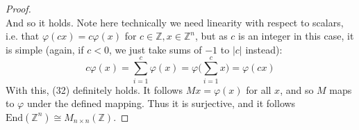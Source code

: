 \documentclass[12pt]{article}
\newenvironment{ex}[2][Exercise]{\begin{trivlist}
\item[\hskip \labelsep {\bfseries #1}\hskip \labelsep {\bfseries #2.}]}{\end{trivlist}}
\begin{document}
\begin{ex}{3}
\begin{enumerate}[label=(\alph*)]
\begin{proof}
\begin{equation}
        \end{equation}
        And so it holds. Note here technically we need linearity with respect to scalars, i.e. that $\varphi(cx) = c\varphi(x)$ for $c \in \mathbb{Z}, x \in \mathbb{Z}^n$, but as $c$ is an integer in this case, it is simple (again, if $c < 0$, we just take sums of $-1$ to $|c|$ instead):
        \begin{equation}
            c\varphi(x) = \sum_{i = 1}^c \varphi(x) = \varphi \Big ( \sum_{i = 1}^c x \Big) = \varphi(cx)
        \end{equation}
        With this, (32) definitely holds. It follows $Mx = \varphi(x)$ for all $x$, and so $M$ maps to $\varphi$ under the defined mapping. Thus it is surjective, and it follows $\text{End}(\mathbb{Z}^n) \cong M_{n \times n}(\mathbb{Z})$.
    \end{proof}
    \end{enumerate}
\end{ex}
\end{document}
